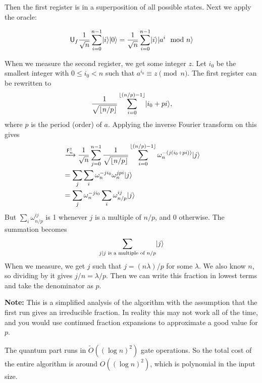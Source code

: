 \documentclass[letterpaper]{article}
\DeclarePairedDelimiter{\ket}{\lvert}{\rangle}
\DeclarePairedDelimiter{\floor}{\lfloor}{\rfloor}
\newcommand{\op}[1]{\textsf{#1}}
\newcommand{\oracle}{\op{U}_f}
\renewcommand{\o}[2]{\omega_{#1}^{#2}}
\begin{document}
		Then the first register is in a superposition of all possible states.
		Next we apply the oracle:
		
		\[
			\oracle \frac{1}{\sqrt{n}}\sum_{i=0}^{n-1}\ket{i}\ket0 = 
			\frac{1}{\sqrt{n}}\sum_{i=0}^{n-1}\ket{i}\ket{a^i\mod{n}}
		\]

		When we measure the second register, we get some integer $z$. Let $i_0$
		be the smallest integer with $0\leq i_0 < n$ such that $a^{i_0}\equiv
		z\pmod{n}$. The first register can be rewritten to 
		\[\frac{1}{\sqrt{\floor{n/p}}}\sum_{i=0}^{\lfloor (n/p)-1\rfloor}\ket{i_0+pi},\] 
		where $p$ is the period (order) of $a$. Applying the inverse Fourier
		transform on this gives
		\begin{align*} 
		&\xrightarrow{\op{F}_n^\dagger}\frac1{\sqrt{n}}
		\sum_{j=0}^{n-1}
		\frac{1}{\sqrt{\floor{n/p}}}\sum_{i=0}^{\floor{(n/p)-1}}
		\o{n}{-(j(i_0+pi))}\ket{j}\\
			&= \sum_j\sum_i \o{n}{-ji_0}\o{n}{jpi}\ket{j}\\
			&= \sum_j\o{n}{-ji_0}\sum_i\o{n/p}{ij}\ket{j}
		\end{align*}
		But $\sum_i\o{n/p}{ij}$ is 1 whenever $j$ is a multiple of $n/p$, and 0
		otherwise. The summation becomes
		\[ \sum_{j\mid j \text{ is a multiple of } n/p} \ket{j}\]
		When we measure, we get $j$ such that $j = (n\lambda)/p$ for some
		$\lambda$. We also know $n$, so dividing by it gives $j/n = \lambda/p$.
		Then we can write this fraction in lowest terms and take the denominator
		as $p$. 

		\textbf{Note:} This is a simplified analysis of the algorithm with the
		assumption that the first run gives an irreducible fraction. In reality
		this may not work all of the time, and you would use continued fraction
		expansions to approximate a good value for $p$.

		The quantum part runs in $\widetilde{O}((\log{n})^2)$ gate operations.
		So the total cost of the entire algorithm is around $O((\log{n})^2)$, which is polynomial in the input size.
\end{document}
